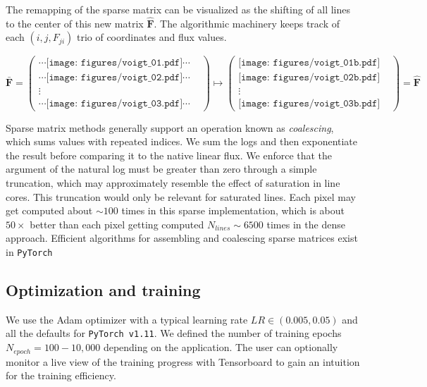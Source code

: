 \documentclass[modern]{aastex631}
\begin{document}
The remapping of the sparse matrix can be visualized as the shifting of all lines to the center of this new matrix $\bm{\hat{F}}$.  The algorithmic machinery keeps track of each $(i, j, F_{ji})$ trio of coordinates and flux values.


\begin{equation} \bm{\bar{F}} =
    \begin{pmatrix}
        \cdots \texttt{[image: figures/voigt\_01.pdf]}  \cdots & \\
        \cdots \texttt{[image: figures/voigt\_02.pdf]}  \cdots & \\
        \vdots                                                            & \\
        \cdots \texttt{[image: figures/voigt\_03.pdf]} \cdots  &
    \end{pmatrix} \mapsto
    \begin{pmatrix}
        \texttt{[image: figures/voigt\_01b.pdf]} & \\
        \texttt{[image: figures/voigt\_02b.pdf]} & \\
        \vdots                                              & \\
        \texttt{[image: figures/voigt\_03b.pdf]} &
    \end{pmatrix} = \bm{\hat{F}}
\end{equation}


Sparse matrix methods generally support an operation known as \emph{coalescing}, which sums values with repeated indices.  We sum the logs and then exponentiate the result before comparing it to the native linear flux. We enforce that the argument of the natural log must be greater than zero through a simple truncation, which may approximately resemble the effect of saturation in line cores. This truncation would only be relevant for saturated lines. Each pixel may get computed about $\sim100$ times in this sparse implementation, which is about $50\times$ better than each pixel getting computed $N_{lines}\sim6500$ times in the dense approach.  Efficient algorithms for assembling and coalescing sparse matrices exist in \texttt{PyTorch}



\subsection{Optimization and training}

We use the Adam optimizer \citep{2014arXiv1412.6980K} with a typical learning rate $LR\in (0.005, 0.05)$ and all the defaults for \texttt{PyTorch v1.11}.  We defined the number of training epochs $N_{epoch}=100-10,000$ depending on the application. The user can optionally monitor a live view of the training progress with Tensorboard \citep{tensorflow2015-whitepaper} to gain an intuition for the training efficiency.
\end{document}
